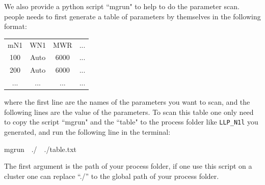 \documentclass[12pt]{article}
\begin{document}
We also provide a python script ``mgrun" to help to do the parameter scan. people needs to first generate a table of parameters by themselves in the following format:
\begin{center}
\begin{tabular}{c c c c}

    mN1 & WN1 & MWR & ...\\
    100 & Auto & 6000 & ... \\
	200 & Auto & 6000 & ... \\
    ... & ... & ... & ...
\end{tabular}
\end{center}
where the first line are the names of the parameters you want to scan, and the following lines are the value of the parameters. To scan this table one only need to copy the script ``mgrun" and the ``table" to the process folder like \texttt{LLP\_N1l} you generated, and run the following line in the terminal:
\begin{center}
mgrun\ \  ./\ \  ./table.txt
\end{center}
The first argument is the path of your process folder, if one use this script on a cluster one can replace ``./'' to the global path of your process folder.
\end{document}
